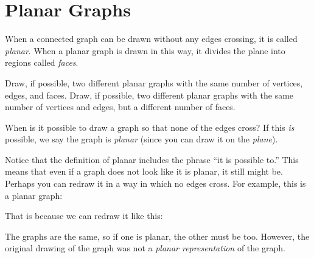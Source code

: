 \documentclass[12pt]{article}
\begin{document}
\newpage
\section{Planar Graphs}\label{sec:planar}


\begin{activity}
When a connected graph can be drawn without any edges crossing, it is called {\em planar}.  When a planar graph is drawn in this way, it divides the plane into regions called {\em faces}.
\begin{questions}
\question Draw, if possible, two different planar graphs with the same number of vertices, edges, and faces.
\question Draw, if possible, two different planar graphs with the same number of vertices and edges, but a different number of faces.
\end{questions}
\end{activity}

When is it possible to draw a graph so that none of the edges cross? If this \emph{is} possible, we say the graph is \emph{planar} (since you can draw it on the \emph{plane}).

Notice that the definition of planar includes the phrase ``it is possible to.''  This means that even if a graph does not look like it is planar, it still might be.  Perhaps you can redraw it in a way in which no edges cross.  For example, this is a planar graph:

\begin{center}

\end{center}

That is because we can redraw it like this:

\begin{center}
\end{center}

The graphs are the same, so if one is planar, the other must be too.  However, the original drawing of the graph was not a {\em planar representation} of the graph.
\end{document}
